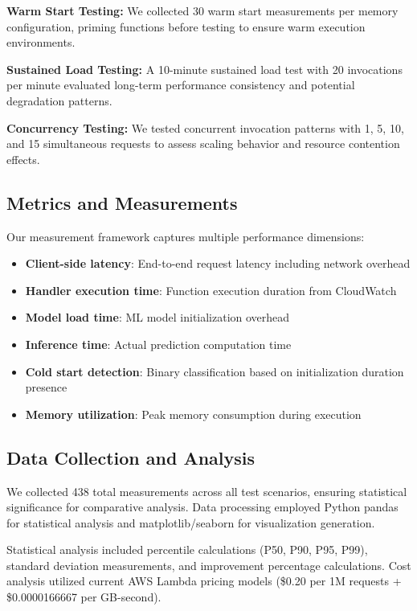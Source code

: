 \documentclass[conference]{IEEEtran}
\begin{document}
\textbf{Warm Start Testing:} We collected 30 warm start measurements per memory configuration, priming functions before testing to ensure warm execution environments.

\textbf{Sustained Load Testing:} A 10-minute sustained load test with 20 invocations per minute evaluated long-term performance consistency and potential degradation patterns.

\textbf{Concurrency Testing:} We tested concurrent invocation patterns with 1, 5, 10, and 15 simultaneous requests to assess scaling behavior and resource contention effects.

\subsection{Metrics and Measurements}
Our measurement framework captures multiple performance dimensions:

\begin{itemize}
\item \textbf{Client-side latency}: End-to-end request latency including network overhead
\item \textbf{Handler execution time}: Function execution duration from CloudWatch
\item \textbf{Model load time}: ML model initialization overhead
\item \textbf{Inference time}: Actual prediction computation time
\item \textbf{Cold start detection}: Binary classification based on initialization duration presence
\item \textbf{Memory utilization}: Peak memory consumption during execution
\end{itemize}

\subsection{Data Collection and Analysis}
We collected 438 total measurements across all test scenarios, ensuring statistical significance for comparative analysis. Data processing employed Python pandas for statistical analysis and matplotlib/seaborn for visualization generation.

Statistical analysis included percentile calculations (P50, P90, P95, P99), standard deviation measurements, and improvement percentage calculations. Cost analysis utilized current AWS Lambda pricing models (\$0.20 per 1M requests + \$0.0000166667 per GB-second).
\end{document}
